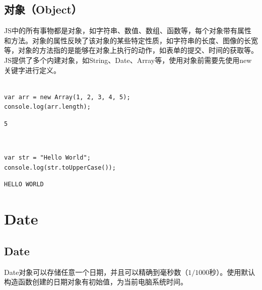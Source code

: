 \subsection{对象（Object）}

JS中的所有事物都是对象，如字符串、数值、数组、函数等，每个对象带有属性和方法。对象的属性反映了该对象的某些特定性质，如字符串的长度、图像的长宽等，对象的方法指的是能够在对象上执行的动作，如表单的提交、时间的获取等。 \\

JS提供了多个内建对象，如String、Date、Array等，使用对象前需要先使用new关键字进行定义。 \\

 \\

\begin{lstlisting}[style=htmlcssjs]
var arr = new Array(1, 2, 3, 4, 5);
console.log(arr.length);
\end{lstlisting}

\begin{tcolorbox}
	\begin{verbatim}
5
	\end{verbatim}
\end{tcolorbox}

\vspace{0.5cm}

 \\

\begin{lstlisting}[style=htmlcssjs]
var str = "Hello World";
console.log(str.toUpperCase());
\end{lstlisting}

\begin{tcolorbox}
	\begin{verbatim}
HELLO WORLD
	\end{verbatim}
\end{tcolorbox}

\newpage

\section{Date}

\subsection{Date}

Date对象可以存储任意一个日期，并且可以精确到毫秒数（$ 1 / 1000 $秒）。使用默认构造函数创建的日期对象有初始值，为当前电脑系统时间。 \\


